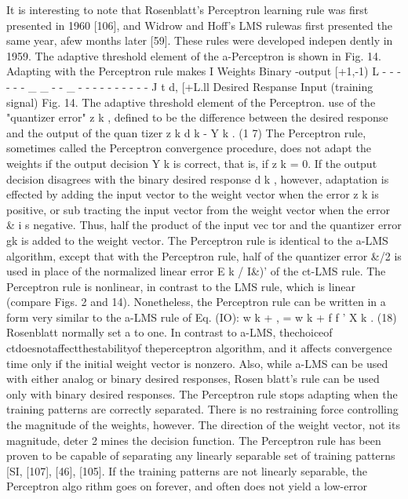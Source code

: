 \documentclass[11pt,a4paper,twocolumn]{article}
\begin{document}
It is interesting to note that Rosenblatt's Perceptron 
learning rule was first presented in 1960 [106], and Widrow 
and Hoff's LMS rulewas first presented the same year, afew 
months later [59]. These rules were developed indepen
dently in 1959. 
The adaptive threshold element of the a-Perceptron is 
shown in Fig. 14. Adapting with the Perceptron rule makes 
I 
Weights 
Binary 
-output 
[+1,-1) 
L - - - - - - \_ \_ - - \_ - - - - - - - - - -  
J t d, [+L.ll 
Desired Respanse Input 
(training signal) 
Fig. 14. The adaptive threshold element of the Perceptron. 
use of the "quantizer error" z k ,  defined to be the difference 
between the desired response and the output of the quan
tizer 
z k  
d k  - Y k .  
(1 7) 
The Perceptron rule, sometimes called the Perceptron 
convergence procedure, does not adapt the weights if the 
output decision Y k  is correct, that is, if z k  = 0. If the output 
decision disagrees with the binary desired response d k ,  
however, adaptation is effected by adding the input vector 
to the weight vector when the error z k  is positive, or sub
tracting the input vector from the weight vector when the 
error \& i s  negative. Thus, half the product of the input vec
tor and the quantizer error gk is added to the weight vector. 
The Perceptron rule is identical to the a-LMS algorithm, 
except that with the Perceptron rule, half of the quantizer 
error \&/2 is used in place of the normalized linear error E k /  
I\&)' 
of the ct-LMS rule. The Perceptron rule is nonlinear, 
in contrast to the LMS rule, which is linear (compare Figs. 
2 and 14). Nonetheless, the Perceptron rule can be written 
in a form very similar to the a-LMS rule of Eq. (IO): 
w k + ,  = w
k
 + f f  ' X k .  
(18) 
Rosenblatt normally set a to one. In contrast to a-LMS, 
thechoiceof ctdoesnotaffectthestabilityof theperceptron 
algorithm, and it affects convergence time only if the initial 
weight vector is nonzero. Also, while a-LMS can be used 
with either analog or binary desired responses, Rosen
blatt's rule can be used only with binary desired responses. 
The Perceptron rule stops adapting when the training 
patterns are correctly separated. There is no restraining 
force controlling the magnitude of the weights, however. 
The direction of the weight vector, not its magnitude, deter
2 
mines the decision function. The Perceptron rule has been 
proven to be capable of separating any linearly separable 
set of training patterns [SI, [107], [46], [105]. If the training 
patterns are not linearly separable, the Perceptron algo
rithm goes on forever, and often does not yield a low-error 
\end{document}

